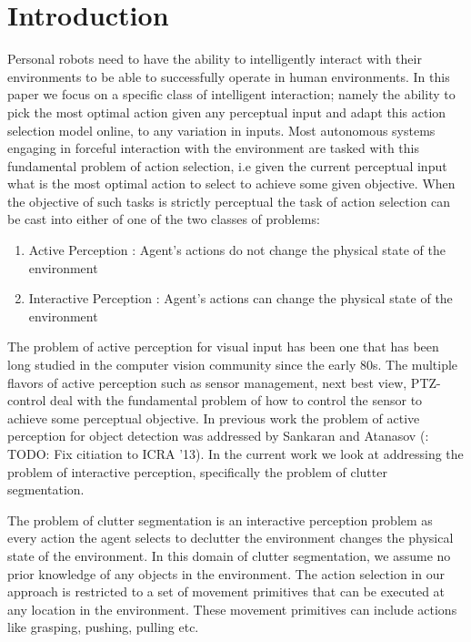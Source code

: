 \section{Introduction}
\label{sec:intro}
Personal robots need to have the ability to intelligently interact with their environments to be able to successfully operate in human environments. In this paper we focus on a specific class of intelligent interaction; namely the ability to pick the most optimal action given any perceptual input and adapt this action selection model online, to any variation in inputs. Most autonomous systems engaging in forceful interaction with the environment are tasked with this fundamental problem of action selection, i.e given the current perceptual input what is the most optimal action to select to achieve some given objective. When the objective of such tasks is strictly perceptual the task of action selection can be cast into either of one of the two classes of problems:\\
\begin{enumerate}
 \item Active Perception : Agent's actions do not change the physical state of the environment\\ 
 \item Interactive Perception : Agent's actions can change the physical state of the environment\\
\end{enumerate}

The problem of active perception for visual input has been one that has been long studied in the computer vision community since the early 80s. The multiple flavors of active perception such as sensor management, next best view, PTZ-control deal with the fundamental problem of how to control the sensor to achieve some perceptual objective. In previous work the problem of active perception for object detection was addressed by Sankaran and Atanasov (\cite{Javidi12_Journal}: TODO: Fix citiation to ICRA '13). In the current work we look at addressing the problem of interactive perception, specifically the problem of clutter segmentation.  

The problem of clutter segmentation is an interactive perception problem as every action the agent selects to declutter the environment changes the physical state of the environment. In this domain of clutter segmentation, we assume no prior knowledge of any objects in the environment. The action selection in our approach is restricted to a set of movement primitives that can be executed at any location in the environment. These movement primitives can include actions like grasping, pushing, pulling etc.

